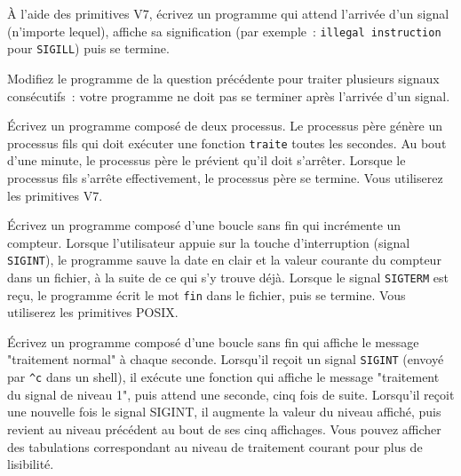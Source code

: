 %


% 


\question

À l'aide des primitives V7, écrivez un programme qui attend l'arrivée
d'un signal (n'importe lequel), affiche sa signification (par
exemple~:  {\tt illegal instruction} pour {\tt SIGILL}) puis se
termine.


\question

Modifiez le programme de la question précédente pour traiter plusieurs
signaux consécutifs~: votre programme ne doit pas se terminer après
l'arrivée d'un signal.


\question

Écrivez un programme composé de deux processus.  Le processus père
génère un processus fils qui doit exécuter une fonction {\tt traite}
toutes les secondes.  Au bout d'une minute, le processus père le
prévient qu'il doit s'arrêter.  Lorsque le processus fils s'arrête
effectivement, le processus père se termine. Vous utiliserez les
primitives V7.


\question

Écrivez un programme composé d'une boucle sans fin qui
incrémente un compteur. Lorsque l'utilisateur appuie sur la touche
d'interruption (signal {\tt SIGINT}), le programme sauve la date en
clair et la valeur courante du compteur dans un fichier,
à la suite de ce qui s'y trouve déjà.
Lorsque le signal {\tt SIGTERM} est reçu, le programme écrit
le mot {\tt fin} dans le fichier, puis se termine. Vous utiliserez les
primitives POSIX.


\question

Écrivez un programme composé d'une boucle sans fin qui affiche le
message "traitement normal" à chaque seconde. Lorsqu'il reçoit un signal
{\tt SIGINT} (envoyé par {\tt \^{ }c} dans un shell), il exécute une
fonction qui affiche le message "traitement du signal de niveau 1", puis
attend une seconde, cinq fois de suite. Lorsqu'il reçoit une nouvelle
fois le signal SIGINT, il augmente la valeur du niveau affiché, puis
revient au niveau précédent au bout de ses cinq affichages. Vous pouvez
afficher des tabulations correspondant au niveau de traitement courant
pour plus de lisibilité.


